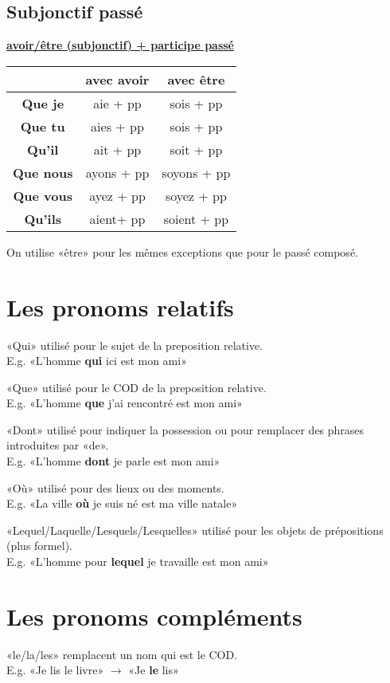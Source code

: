 \documentclass[12pt, a4paper]{article}
\begin{document}
\begin{multicols*}{3}
\subsection{Subjonctif passé}
\begin{center}
\underline{\textbf{avoir/être (subjonctif) + participe passé}}
\begin{tabular}{|c|c|c|}
  \hline
  & \textbf{avec avoir} & \textbf{avec être}\\\hline
  \textbf{Que je} & aie + pp & sois + pp \\\hline
  \textbf{Que tu} & aies + pp & sois + pp \\\hline
  \textbf{Qu'il} & ait + pp & soit + pp \\\hline
  \textbf{Que nous} & ayons + pp & soyons + pp \\\hline
  \textbf{Que vous} & ayez + pp & soyez + pp \\\hline
  \textbf{Qu'ils} & aient+ pp & soient + pp \\\hline
\end{tabular}
\end{center}

On utilise «être» pour les mêmes exceptions que pour le passé composé.

\colbreak
\section{Les pronoms relatifs}
«Qui» utilisé pour le sujet de la preposition relative.\\
E.g. «L'homme \textbf{qui} ici est mon ami»

«Que» utilisé pour le COD de la preposition relative.\\
E.g. «L'homme \textbf{que} j'ai rencontré est mon ami»

«Dont» utilisé pour indiquer la possession ou pour remplacer des phrases introduites par «de».\\
E.g. «L'homme \textbf{dont} je parle est mon ami»

«Où» utilisé pour des lieux ou des moments.\\
E.g. «La ville \textbf{où} je suis né est ma ville natale»

«Lequel/Laquelle/Lesquels/Lesquelles» utilisé pour les objets de prépositions (plus formel).\\ 
E.g. «L'homme pour \textbf{lequel} je travaille est mon ami»

\section{Les pronoms compléments}
«le/la/les» remplacent un nom qui est le COD.\\
E.g. «Je lis le livre» $\rightarrow$ «Je \textbf{le} lis»


\end{multicols*}
\end{document}

